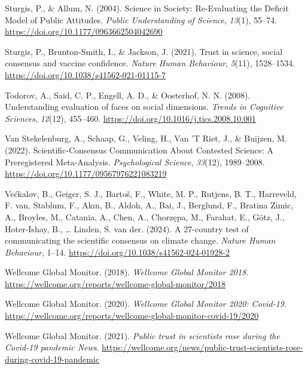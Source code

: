 \documentclass[
  jou,
  floatsintext,
  longtable,
  nolmodern,
  notxfonts,
  notimes,
  colorlinks=true,linkcolor=blue,citecolor=blue,urlcolor=blue]{apa7}
\newlength{\cslhangindent}
\newenvironment{CSLReferences}[2] %
 {\begin{list}{}{%
  \setlength{\itemindent}{0pt}
  \setlength{\leftmargin}{0pt}
  \setlength{\parsep}{0pt}
  \ifodd #1
   \setlength{\leftmargin}{\cslhangindent}
   \setlength{\itemindent}{-1\cslhangindent}
  \fi
  \setlength{\itemsep}{#2\baselineskip}}}
 {\end{list}}
\begin{document}
\begin{CSLReferences}{1}{0}
Sturgis, P., \& Allum, N. (2004). Science in Society: Re-Evaluating the
Deficit Model of Public Attitudes. \emph{Public Understanding of
Science}, \emph{13}(1), 55--74.
\url{https://doi.org/10.1177/0963662504042690}

Sturgis, P., Brunton-Smith, I., \& Jackson, J. (2021). Trust in science,
social consensus and vaccine confidence. \emph{Nature Human Behaviour},
\emph{5}(11), 1528--1534.
\url{https://doi.org/10.1038/s41562-021-01115-7}

Todorov, A., Said, C. P., Engell, A. D., \& Oosterhof, N. N. (2008).
Understanding evaluation of faces on social dimensions. \emph{Trends in
Cognitive Sciences}, \emph{12}(12), 455--460.
\url{https://doi.org/10.1016/j.tics.2008.10.001}

Van Stekelenburg, A., Schaap, G., Veling, H., Van 'T Riet, J., \&
Buijzen, M. (2022). Scientific-Consensus Communication About Contested
Science: A Preregistered Meta-Analysis. \emph{Psychological Science},
\emph{33}(12), 1989--2008.
\url{https://doi.org/10.1177/09567976221083219}

Većkalov, B., Geiger, S. J., Bartoš, F., White, M. P., Rutjens, B. T.,
Harreveld, F. van, Stablum, F., Akın, B., Aldoh, A., Bai, J., Berglund,
F., Bratina Zimic, A., Broyles, M., Catania, A., Chen, A., Chorzępa, M.,
Farahat, E., Götz, J., Hoter-Ishay, B., \ldots{} Linden, S. van der.
(2024). A 27-country test of communicating the scientific consensus on
climate change. \emph{Nature Human Behaviour}, 1--14.
\url{https://doi.org/10.1038/s41562-024-01928-2}

Wellcome Global Monitor. (2018). \emph{Wellcome Global Monitor 2018}.
\url{https://wellcome.org/reports/wellcome-global-monitor/2018}

Wellcome Global Monitor. (2020). \emph{Wellcome Global Monitor 2020:
Covid-19}.
\url{https://wellcome.org/reports/wellcome-global-monitor-covid-19/2020}

Wellcome Global Monitor. (2021). \emph{Public trust in scientists rose
during the Covid-19 pandemic \textbar{} News}.
\url{https://wellcome.org/news/public-trust-scientists-rose-during-covid-19-pandemic}


\end{CSLReferences}
\end{document}
